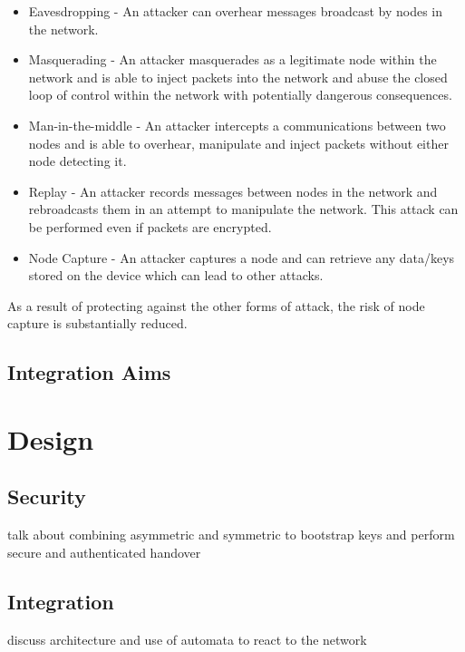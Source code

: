 \documentclass[conference]{./sty/IEEEtran}
\begin{document}
\begin{itemize}
  \item Eavesdropping - An attacker can overhear messages broadcast by nodes in the network.  
  \item Masquerading - An attacker masquerades as a legitimate node within the network and is able to inject packets into the network and abuse the closed loop of control within the network with potentially dangerous consequences. 
  \item Man-in-the-middle - An attacker intercepts a communications between two nodes and is able to overhear, manipulate and inject packets without either node detecting it. 
  \item Replay - An attacker records messages between nodes in the network and rebroadcasts them in an attempt to manipulate the network. This attack can be performed even if packets are encrypted. 
  \item Node Capture - An attacker captures a node and can retrieve any data/keys stored on the device which can lead to other attacks.
\end{itemize}
As a result of protecting against the other forms of attack, the risk of node capture is substantially reduced.
\subsection{Integration Aims} %
\label{sub:integration_aims}


\section{Design} %
\label{sec:design}

\subsection{Security} %
\label{sub:security}
talk about combining asymmetric and symmetric to bootstrap keys and perform secure and authenticated handover
\subsection{Integration} %
\label{sub:design_integration}
discuss architecture and use of automata to react to the network
\end{document}
